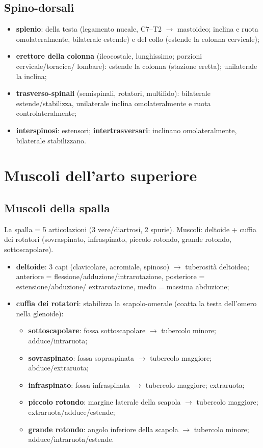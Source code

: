 \subsection{Spino-dorsali}
\begin{itemize}
  \item \textbf{splenio}: della testa (legamento nucale, C7--T2 $\rightarrow$ mastoideo; inclina e
    ruota omolateralmente, bilaterale estende) e del collo (estende la colonna cervicale);
  \item \textbf{erettore della colonna} (ileocostale, lunghissimo; porzioni cervicale/toracica/
    lombare): estende la colonna (stazione eretta); unilaterale la inclina;
  \item \textbf{trasverso-spinali} (semispinali, rotatori, multifido): bilaterale estende/stabilizza,
    unilaterale inclina omolateralmente e ruota controlateralmente;
  \item \textbf{interspinosi}: estensori; \textbf{intertrasversari}: inclinano omolateralmente,
    bilaterale stabilizzano.
\end{itemize}

\section{Muscoli dell'arto superiore}

\subsection{Muscoli della spalla}
La spalla = 5 articolazioni (3 vere/diartrosi, 2 spurie). Muscoli: deltoide + cuffia dei rotatori
(sovraspinato, infraspinato, piccolo rotondo, grande rotondo, sottoscapolare).
\begin{itemize}
  \item \textbf{deltoide}: 3 capi (clavicolare, acromiale, spinoso) $\rightarrow$ tuberosità
    deltoidea; anteriore = flessione/adduzione/intrarotazione, posteriore = estensione/abduzione/
    extrarotazione, medio = massima abduzione;
  \item \textbf{cuffia dei rotatori}: stabilizza la scapolo-omerale (coatta la testa dell'omero
    nella glenoide):
    \begin{itemize}
      \item \textbf{sottoscapolare}: fossa sottoscapolare $\rightarrow$ tubercolo minore;
        adduce/intraruota;
      \item \textbf{sovraspinato}: fossa sopraspinata $\rightarrow$ tubercolo maggiore;
        abduce/extraruota;
      \item \textbf{infraspinato}: fossa infraspinata $\rightarrow$ tubercolo maggiore; extraruota;
      \item \textbf{piccolo rotondo}: margine laterale della scapola $\rightarrow$ tubercolo
        maggiore; extraruota/adduce/estende;
      \item \textbf{grande rotondo}: angolo inferiore della scapola $\rightarrow$ tubercolo minore;
        adduce/intraruota/estende.
    \end{itemize}
\end{itemize}

